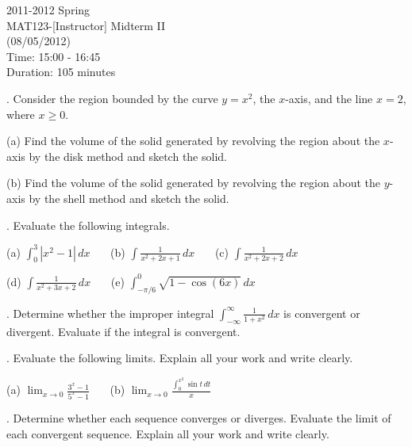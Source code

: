 \documentclass{article}
\begin{document}
\pagestyle{empty}
\large

\begin{center}
2011-2012 Spring \\MAT123-[Instructor] Midterm II\\(08/05/2012)\\Time: 15:00 - 16:45\\Duration: 105 minutes
\end{center}

. Consider the region bounded by the curve $y=x^2$, the $x$-axis, and the line $x=2$, where $x\geq0$.

\hfill

(a) Find the volume of the solid generated by revolving the region about the $x$-axis by the disk method and sketch the solid.

\hfill

(b) Find the volume of the solid generated by revolving the region about the $y$-axis by the shell method and sketch the solid.

\hfill

. Evaluate the following integrals.

\hfill

(a) $\displaystyle \int_0^3\left|x^2-1\right|\, dx$ \ \ \ (b) $\displaystyle\int\frac1{x^2+2x+1}\,dx$ \ \ \ (c) $\displaystyle\int\frac1{x^2+2x+2}\,dx$

\hfill

\hfill

(d) $\displaystyle\int\frac1{x^2+3x+2}\,dx$ \ \ \ (e) $\displaystyle\int_{-\pi/6}^0\sqrt{1-\cos(6x)}\,dx$

\hfill

. Determine whether the improper integral $\displaystyle\int_{-\infty}^\infty\frac1{1+x^2}\,dx$ is convergent or divergent. Evaluate if the integral is convergent.

\hfill

. Evaluate the following limits. Explain all your work and write clearly.

\hfill

(a) $\displaystyle\lim_{x\to0}\frac{3^x-1}{5^x-1}$ \ \ \ (b) $\displaystyle \lim_{x\to0}\frac{\displaystyle\int_0^{x^2}\sin t\,dt}x$

\hfill

. Determine whether each sequence converges or diverges. Evaluate the limit of each convergent sequence. Explain all your work and write clearly.

\hfill
\end{document}

